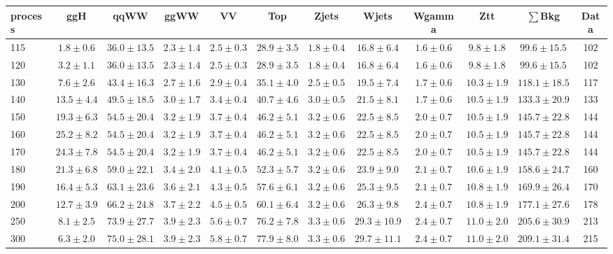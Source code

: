 \begin{table}
{\tiny
 \begin{center}
 \begin{tabular}{l c c c c c c c c c c c }
 \hline
 process & ggH & qqWW & ggWW & VV & Top & Zjets & Wjets & Wgamma & Ztt & $\sum$Bkg & Data \\
 \hline
115 & $1.8\pm0.6$ & $36.0\pm13.5$ & $2.3\pm1.4$ & $2.5\pm0.3$ & $28.9\pm3.5$ & $1.8\pm0.4$ & $16.8\pm6.4$ & $1.6\pm0.6$ & $9.8\pm1.8$ & $99.6\pm15.5$ & 102 \\
120 & $3.2\pm1.1$ & $36.0\pm13.5$ & $2.3\pm1.4$ & $2.5\pm0.3$ & $28.9\pm3.5$ & $1.8\pm0.4$ & $16.8\pm6.4$ & $1.6\pm0.6$ & $9.8\pm1.8$ & $99.6\pm15.5$ & 102 \\
130 & $7.6\pm2.6$ & $43.4\pm16.3$ & $2.7\pm1.6$ & $2.9\pm0.4$ & $35.1\pm4.0$ & $2.5\pm0.5$ & $19.5\pm7.4$ & $1.7\pm0.6$ & $10.3\pm1.9$ & $118.1\pm18.5$ & 117 \\
140 & $13.5\pm4.4$ & $49.5\pm18.5$ & $3.0\pm1.7$ & $3.4\pm0.4$ & $40.7\pm4.6$ & $3.0\pm0.5$ & $21.5\pm8.1$ & $1.7\pm0.6$ & $10.5\pm1.9$ & $133.3\pm20.9$ & 133 \\
150 & $19.3\pm6.3$ & $54.5\pm20.4$ & $3.2\pm1.9$ & $3.7\pm0.4$ & $46.2\pm5.1$ & $3.2\pm0.6$ & $22.5\pm8.5$ & $2.0\pm0.7$ & $10.5\pm1.9$ & $145.7\pm22.8$ & 144 \\
160 & $25.2\pm8.2$ & $54.5\pm20.4$ & $3.2\pm1.9$ & $3.7\pm0.4$ & $46.2\pm5.1$ & $3.2\pm0.6$ & $22.5\pm8.5$ & $2.0\pm0.7$ & $10.5\pm1.9$ & $145.7\pm22.8$ & 144 \\
170 & $24.3\pm7.8$ & $54.5\pm20.4$ & $3.2\pm1.9$ & $3.7\pm0.4$ & $46.2\pm5.1$ & $3.2\pm0.6$ & $22.5\pm8.5$ & $2.0\pm0.7$ & $10.5\pm1.9$ & $145.7\pm22.8$ & 144 \\
180 & $21.3\pm6.8$ & $59.0\pm22.1$ & $3.4\pm2.0$ & $4.1\pm0.5$ & $52.3\pm5.7$ & $3.2\pm0.6$ & $23.9\pm9.0$ & $2.1\pm0.7$ & $10.6\pm1.9$ & $158.6\pm24.7$ & 160 \\
190 & $16.4\pm5.3$ & $63.1\pm23.6$ & $3.6\pm2.1$ & $4.3\pm0.5$ & $57.6\pm6.1$ & $3.2\pm0.6$ & $25.3\pm9.5$ & $2.1\pm0.7$ & $10.8\pm1.9$ & $169.9\pm26.4$ & 170 \\
200 & $12.7\pm3.9$ & $66.2\pm24.8$ & $3.7\pm2.2$ & $4.5\pm0.5$ & $60.1\pm6.4$ & $3.2\pm0.6$ & $26.3\pm9.8$ & $2.4\pm0.7$ & $10.8\pm1.9$ & $177.1\pm27.6$ & 178 \\
250 & $8.1\pm2.5$ & $73.9\pm27.7$ & $3.9\pm2.3$ & $5.6\pm0.7$ & $76.2\pm7.8$ & $3.3\pm0.6$ & $29.3\pm10.9$ & $2.4\pm0.7$ & $11.0\pm2.0$ & $205.6\pm30.9$ & 213 \\
300 & $6.3\pm2.0$ & $75.0\pm28.1$ & $3.9\pm2.3$ & $5.8\pm0.7$ & $77.9\pm8.0$ & $3.3\pm0.6$ & $29.7\pm11.1$ & $2.4\pm0.7$ & $11.0\pm2.0$ & $209.1\pm31.4$ & 215 \\

\end{tabular}
\end{center}}
\end{table}
